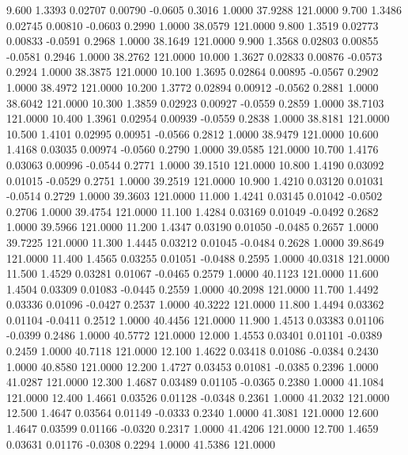    9.600   1.3393   0.02707   0.00790  -0.0605   0.3016   1.0000  37.9288 121.0000
   9.700   1.3486   0.02745   0.00810  -0.0603   0.2990   1.0000  38.0579 121.0000
   9.800   1.3519   0.02773   0.00833  -0.0591   0.2968   1.0000  38.1649 121.0000
   9.900   1.3568   0.02803   0.00855  -0.0581   0.2946   1.0000  38.2762 121.0000
  10.000   1.3627   0.02833   0.00876  -0.0573   0.2924   1.0000  38.3875 121.0000
  10.100   1.3695   0.02864   0.00895  -0.0567   0.2902   1.0000  38.4972 121.0000
  10.200   1.3772   0.02894   0.00912  -0.0562   0.2881   1.0000  38.6042 121.0000
  10.300   1.3859   0.02923   0.00927  -0.0559   0.2859   1.0000  38.7103 121.0000
  10.400   1.3961   0.02954   0.00939  -0.0559   0.2838   1.0000  38.8181 121.0000
  10.500   1.4101   0.02995   0.00951  -0.0566   0.2812   1.0000  38.9479 121.0000
  10.600   1.4168   0.03035   0.00974  -0.0560   0.2790   1.0000  39.0585 121.0000
  10.700   1.4176   0.03063   0.00996  -0.0544   0.2771   1.0000  39.1510 121.0000
  10.800   1.4190   0.03092   0.01015  -0.0529   0.2751   1.0000  39.2519 121.0000
  10.900   1.4210   0.03120   0.01031  -0.0514   0.2729   1.0000  39.3603 121.0000
  11.000   1.4241   0.03145   0.01042  -0.0502   0.2706   1.0000  39.4754 121.0000
  11.100   1.4284   0.03169   0.01049  -0.0492   0.2682   1.0000  39.5966 121.0000
  11.200   1.4347   0.03190   0.01050  -0.0485   0.2657   1.0000  39.7225 121.0000
  11.300   1.4445   0.03212   0.01045  -0.0484   0.2628   1.0000  39.8649 121.0000
  11.400   1.4565   0.03255   0.01051  -0.0488   0.2595   1.0000  40.0318 121.0000
  11.500   1.4529   0.03281   0.01067  -0.0465   0.2579   1.0000  40.1123 121.0000
  11.600   1.4504   0.03309   0.01083  -0.0445   0.2559   1.0000  40.2098 121.0000
  11.700   1.4492   0.03336   0.01096  -0.0427   0.2537   1.0000  40.3222 121.0000
  11.800   1.4494   0.03362   0.01104  -0.0411   0.2512   1.0000  40.4456 121.0000
  11.900   1.4513   0.03383   0.01106  -0.0399   0.2486   1.0000  40.5772 121.0000
  12.000   1.4553   0.03401   0.01101  -0.0389   0.2459   1.0000  40.7118 121.0000
  12.100   1.4622   0.03418   0.01086  -0.0384   0.2430   1.0000  40.8580 121.0000
  12.200   1.4727   0.03453   0.01081  -0.0385   0.2396   1.0000  41.0287 121.0000
  12.300   1.4687   0.03489   0.01105  -0.0365   0.2380   1.0000  41.1084 121.0000
  12.400   1.4661   0.03526   0.01128  -0.0348   0.2361   1.0000  41.2032 121.0000
  12.500   1.4647   0.03564   0.01149  -0.0333   0.2340   1.0000  41.3081 121.0000
  12.600   1.4647   0.03599   0.01166  -0.0320   0.2317   1.0000  41.4206 121.0000
  12.700   1.4659   0.03631   0.01176  -0.0308   0.2294   1.0000  41.5386 121.0000
